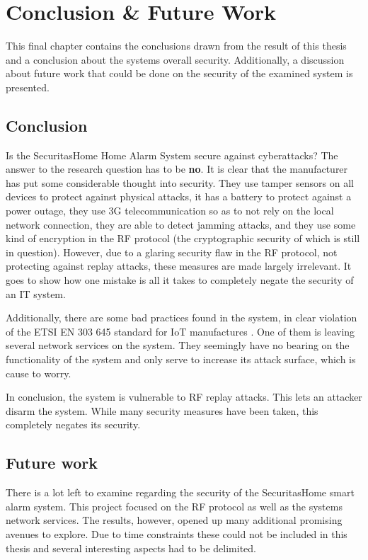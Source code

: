 \chapter{Conclusion \& Future Work} \label{ch:conclusion}
This final chapter contains the conclusions drawn from the result of this thesis and a conclusion about the systems overall security. Additionally, a discussion about future work that could be done on the security of the examined system is presented.

\section{Conclusion}
Is the SecuritasHome Home Alarm System secure against cyberattacks? The answer to the research question has to be \textbf{no}. It is clear that the manufacturer has put some considerable thought into security. They use tamper sensors on all devices to protect against physical attacks, it has a battery to protect against a power outage, they use 3G telecommunication so as to not rely on the local network connection, they are able to detect jamming attacks, and they use some kind of encryption in the RF protocol (the cryptographic security of which is still in question). However, due to a glaring security flaw in the RF protocol, not protecting against replay attacks, these measures are made largely irrelevant. It goes to show how one mistake is all it takes to completely negate the security of an IT system.

Additionally, there are some bad practices found in the system, in clear violation of the ETSI EN 303 645 standard for IoT manufactures \cite{etsi-iot-standard}. One of them is leaving several network services on the system. They seemingly have no bearing on the functionality of the system and only serve to increase its attack surface, which is cause to worry.

In conclusion, the system is vulnerable to RF replay attacks. This lets an attacker disarm the system. While many security measures have been taken, this completely negates its security.

\section{Future work} \label{ch:conclusion:related-work}
There is a lot left to examine regarding the security of the SecuritasHome smart alarm system. This project focused on the RF protocol as well as the systems network services. The results, however, opened up many additional promising avenues to explore. Due to time constraints these could not be included in this thesis and several interesting aspects had to be delimited.

